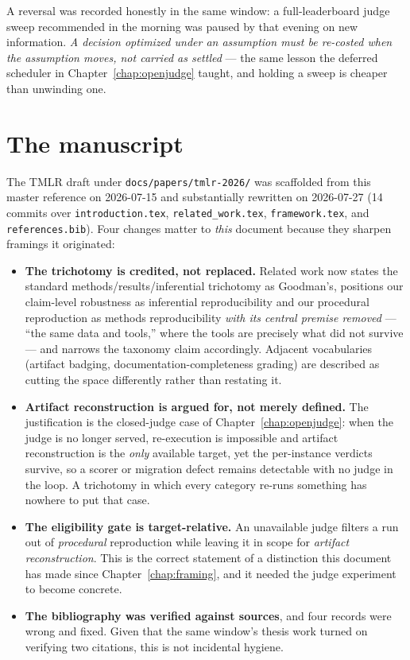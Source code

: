 \documentclass[11pt]{report}
\newcommand{\file}[1]{\texttt{#1}}
\begin{document}
\noindent A reversal was recorded honestly in the same window: a full-leaderboard
judge sweep recommended in the morning was paused by that evening on new
information. \emph{A decision optimized under an assumption must be re-costed when
the assumption moves, not carried as settled} --- the same lesson the deferred
scheduler in Chapter~\ref{chap:openjudge} taught, and holding a sweep is cheaper
than unwinding one.

\section{The manuscript}
\label{sec:paper-drafting}

The TMLR draft under \file{docs/papers/tmlr-2026/} was scaffolded from this master
reference on 2026-07-15 and substantially rewritten on 2026-07-27 (14 commits over
\file{introduction.tex}, \file{related\_work.tex}, \file{framework.tex}, and
\file{references.bib}). Four changes matter to \emph{this} document because they
sharpen framings it originated:

\begin{itemize}[nosep]
  \item \textbf{The trichotomy is credited, not replaced.} Related work now states
        the standard methods/results/inferential trichotomy as Goodman's, positions
        our claim-level robustness as inferential reproducibility and our procedural
        reproduction as methods reproducibility \emph{with its central premise
        removed} --- ``the same data and tools,'' where the tools are precisely what
        did not survive --- and narrows the taxonomy claim accordingly. Adjacent
        vocabularies (artifact badging, documentation-completeness grading) are
        described as cutting the space differently rather than restating it.
  \item \textbf{Artifact reconstruction is argued for, not merely defined.} The
        justification is the closed-judge case of Chapter~\ref{chap:openjudge}: when
        the judge is no longer served, re-execution is impossible and artifact
        reconstruction is the \emph{only} available target, yet the per-instance
        verdicts survive, so a scorer or migration defect remains detectable with no
        judge in the loop. A trichotomy in which every category re-runs something
        has nowhere to put that case.
  \item \textbf{The eligibility gate is target-relative.} An unavailable judge
        filters a run out of \emph{procedural} reproduction while leaving it in scope
        for \emph{artifact reconstruction}. This is the correct statement of a
        distinction this document has made since Chapter~\ref{chap:framing}, and
        it needed the judge experiment to become concrete.
  \item \textbf{The bibliography was verified against sources}, and four records
        were wrong and fixed. Given that the same window's thesis work turned on
        verifying two citations, this is not incidental hygiene.
\end{itemize}
\end{document}
